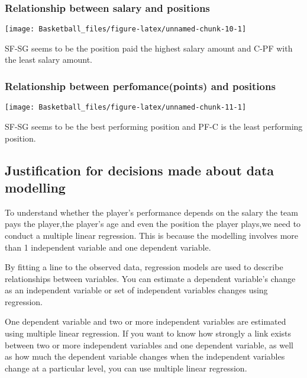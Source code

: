 \documentclass[
]{article}
\begin{document}
\hypertarget{relationship-between-salary-and-positions}{%
\subsubsection{Relationship between salary and
positions}\label{relationship-between-salary-and-positions}}

\texttt{[image: Basketball\_files/figure-latex/unnamed-chunk-10-1]}

SF-SG seems to be the position paid the highest salary amount and C-PF
with the least salary amount.

\hypertarget{relationship-between-perfomancepoints-and-positions}{%
\subsubsection{Relationship between perfomance(points) and
positions}\label{relationship-between-perfomancepoints-and-positions}}

\texttt{[image: Basketball\_files/figure-latex/unnamed-chunk-11-1]}

SF-SG seems to be the best performing position and PF-C is the least
performing position.

\hypertarget{justification-for-decisions-made-about-data-modelling}{%
\subsection{Justification for decisions made about data
modelling}\label{justification-for-decisions-made-about-data-modelling}}

To understand whether the player's performance depends on the salary the
team pays the player,the player's age and even the position the player
plays,we need to conduct a multiple linear regression. This is because
the modelling involves more than 1 independent variable and one
dependent variable.

By fitting a line to the observed data, regression models are used to
describe relationships between variables. You can estimate a dependent
variable's change as an independent variable or set of independent
variables changes using regression.

One dependent variable and two or more independent variables are
estimated using multiple linear regression. If you want to know how
strongly a link exists between two or more independent variables and one
dependent variable, as well as how much the dependent variable changes
when the independent variables change at a particular level, you can use
multiple linear regression.
\end{document}

